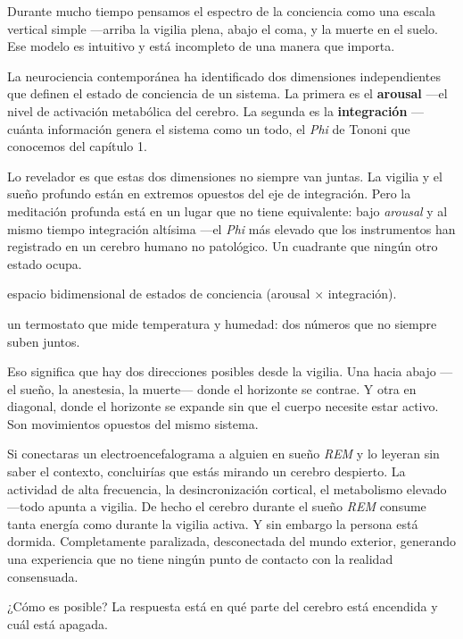Durante mucho tiempo pensamos el espectro de la conciencia como una escala vertical simple —arriba la vigilia plena, abajo el coma, y la muerte en el suelo. Ese modelo es intuitivo y está incompleto de una manera que importa.

La neurociencia contemporánea ha identificado dos dimensiones independientes que definen el estado de conciencia de un sistema. La primera es el \textbf{arousal} —el nivel de activación metabólica del cerebro. La segunda es la \textbf{integración} —cuánta información genera el sistema como un todo, el \emph{Phi} de Tononi que conocemos del capítulo 1.

Lo revelador es que estas dos dimensiones no siempre van juntas. La vigilia y el sueño profundo están en extremos opuestos del eje de integración. Pero la meditación profunda está en un lugar que no tiene equivalente: bajo \emph{arousal} y al mismo tiempo integración altísima —el \emph{Phi} más elevado que los instrumentos han registrado en un cerebro humano no patológico. Un cuadrante que ningún otro estado ocupa.

\begin{fisica}
 espacio bidimensional de estados de conciencia (arousal × integración).

 un termostato que mide temperatura y humedad: dos números que no siempre suben juntos.
\end{fisica}
Eso significa que hay dos direcciones posibles desde la vigilia. Una hacia abajo —el sueño, la anestesia, la muerte— donde el horizonte se contrae. Y otra en diagonal, donde el horizonte se expande sin que el cuerpo necesite estar activo. Son movimientos opuestos del mismo sistema.

\noindent Si conectaras un electroencefalograma a alguien en sueño \emph{REM} y lo leyeran sin saber el contexto, concluirías que estás mirando un cerebro despierto. La actividad de alta frecuencia, la desincronización cortical, el metabolismo elevado —todo apunta a vigilia. De hecho el cerebro durante el sueño \emph{REM} consume tanta energía como durante la vigilia activa. Y sin embargo la persona está dormida. Completamente paralizada, desconectada del mundo exterior, generando una experiencia que no tiene ningún punto de contacto con la realidad consensuada.

¿Cómo es posible? La respuesta está en qué parte del cerebro está encendida y cuál está apagada.

